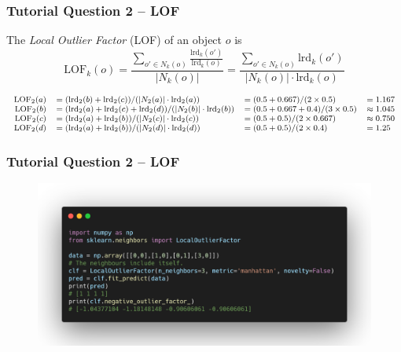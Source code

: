 \documentclass[aspectratio=169, 10pt]{beamer}
\begin{document}
\begin{frame}[t]
    \frametitle{Tutorial Question 2 -- LOF}
    
    The {\em Local Outlier Factor} (LOF) of an object $o$ is
    \[
        \text{LOF}_k(o) = \frac{\sum_{o' \in N_k(o)} \frac{\text{lrd}_k(o')}{\text{lrd}_k(o)}}{|N_k(o)|} 
        = \frac{\sum_{o' \in N_k(o)} \text{lrd}_k(o')}{|N_k(o)| \cdot \text{lrd}_k(o)}
    \]
        
    \begin{equation*}
        \footnotesize
        \begin{array}{rlll}
            \text{LOF}_2(a) & = (\text{lrd}_2(b) + \text{lrd}_2(c)) / (|N_2(a)| \cdot \text{lrd}_2(a)) & = (0.5+0.667) / (2\times 0.5)& = 1.167\\
            \text{LOF}_2(b) & = (\text{lrd}_2(a) + \text{lrd}_2(c) + \text{lrd}_2(d)) / (|N_2(b)| \cdot \text{lrd}_2(b))  & = (0.5+0.667+0.4) / (3\times 0.5)& \approx 1.045\\
            \text{LOF}_2(c) & = (\text{lrd}_2(a) + \text{lrd}_2(b)) / (|N_2(c)| \cdot \text{lrd}_2(c))  & = (0.5+0.5) / (2\times 0.667)& \approx 0.750\\
            \text{LOF}_2(d) & = (\text{lrd}_2(a) + \text{lrd}_2(b)) / (|N_2(d)| \cdot \text{lrd}_2(d))  & = (0.5+0.5) / (2\times 0.4)& = 1.25\\
        \end{array}
    \end{equation*}

\end{frame}

\begin{frame}
    \frametitle{Tutorial Question 2 -- LOF}
    
    \begin{figure}
        \centering
        \includegraphics[width=\textwidth]{../imgs/question2_lof_code.png}
    \end{figure}
\end{frame}
\end{document}
